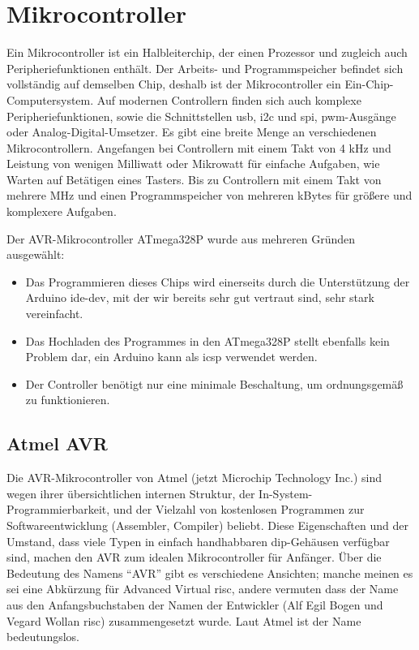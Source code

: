 \section{Mikrocontroller}
Ein Mikrocontroller ist ein Halbleiterchip, der einen Prozessor und zugleich auch Peripheriefunktionen enthält.
Der Arbeits- und Programmspeicher befindet sich vollständig auf demselben Chip, deshalb ist der Mikrocontroller ein Ein-Chip-Computersystem.
Auf modernen Controllern finden sich auch komplexe Peripheriefunktionen, sowie die Schnittstellen \ac{usb}, \ac{i2c} und \ac{spi}, \ac{pwm}-Ausgänge oder Analog-Digital-Umsetzer.
Es gibt eine breite Menge an verschiedenen Mikrocontrollern.
Angefangen bei Controllern mit einem Takt von 4 kHz und Leistung von wenigen Milliwatt oder Mikrowatt für einfache Aufgaben, wie Warten auf Betätigen eines Tasters.
Bis zu Controllern mit einem Takt von mehrere MHz und einen Programmspeicher von mehreren kBytes für größere und komplexere Aufgaben.\par

Der AVR-Mikrocontroller ATmega328P wurde aus mehreren Gründen ausgewählt:
\begin{itemize}
	\item Das Programmieren dieses Chips wird einerseits durch die Unterstützung der Arduino \ac{ide-dev}, mit der wir bereits sehr gut vertraut sind, sehr stark vereinfacht.
	\item Das Hochladen des Programmes in den ATmega328P stellt ebenfalls kein Problem dar, ein Arduino kann als \ac{icsp} verwendet werden.
	\item Der Controller benötigt nur eine minimale Beschaltung, um ordnungsgemäß zu funktionieren.
\end{itemize}

\subsection{Atmel AVR}
Die AVR-Mikrocontroller von Atmel (jetzt Microchip Technology Inc.) sind wegen ihrer übersichtlichen internen Struktur, der In-System-Programmierbarkeit, und der Vielzahl von kostenlosen Programmen zur Softwareentwicklung (Assembler, Compiler) beliebt. Diese Eigenschaften und der Umstand, dass viele Typen in einfach handhabbaren \ac{dip}-Gehäusen verfügbar sind, machen den AVR zum idealen Mikrocontroller für Anfänger.
Über die Bedeutung des Namens \enquote{AVR} gibt es verschiedene Ansichten; manche meinen es sei eine Abkürzung für Advanced Virtual \ac{risc}, andere vermuten dass der Name aus den Anfangsbuchstaben der Namen der Entwickler (Alf Egil Bogen und Vegard Wollan \ac{risc}) zusammengesetzt wurde. Laut Atmel ist der Name bedeutungslos.

